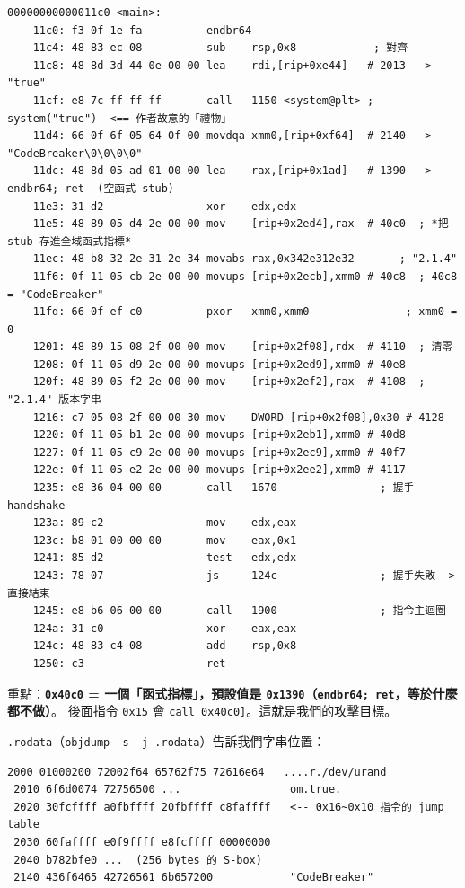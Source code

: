 \documentclass[10pt,a4paper]{article}
\begin{document}
\begin{Verbatim}[breaklines=true,breakanywhere=true,breakautoindent=false,fontsize=\fontsize{7.0}{9.5}\selectfont]
00000000000011c0 <main>:
    11c0: f3 0f 1e fa          endbr64
    11c4: 48 83 ec 08          sub    rsp,0x8            ; 對齊
    11c8: 48 8d 3d 44 0e 00 00 lea    rdi,[rip+0xe44]   # 2013  -> "true"
    11cf: e8 7c ff ff ff       call   1150 <system@plt> ; system("true")  <== 作者故意的「禮物」
    11d4: 66 0f 6f 05 64 0f 00 movdqa xmm0,[rip+0xf64]  # 2140  -> "CodeBreaker\0\0\0\0"
    11dc: 48 8d 05 ad 01 00 00 lea    rax,[rip+0x1ad]   # 1390  -> endbr64; ret  (空函式 stub)
    11e3: 31 d2                xor    edx,edx
    11e5: 48 89 05 d4 2e 00 00 mov    [rip+0x2ed4],rax  # 40c0  ; *把 stub 存進全域函式指標*
    11ec: 48 b8 32 2e 31 2e 34 movabs rax,0x342e312e32       ; "2.1.4"
    11f6: 0f 11 05 cb 2e 00 00 movups [rip+0x2ecb],xmm0 # 40c8  ; 40c8 = "CodeBreaker"
    11fd: 66 0f ef c0          pxor   xmm0,xmm0               ; xmm0 = 0
    1201: 48 89 15 08 2f 00 00 mov    [rip+0x2f08],rdx  # 4110  ; 清零
    1208: 0f 11 05 d9 2e 00 00 movups [rip+0x2ed9],xmm0 # 40e8
    120f: 48 89 05 f2 2e 00 00 mov    [rip+0x2ef2],rax  # 4108  ; "2.1.4" 版本字串
    1216: c7 05 08 2f 00 00 30 mov    DWORD [rip+0x2f08],0x30 # 4128
    1220: 0f 11 05 b1 2e 00 00 movups [rip+0x2eb1],xmm0 # 40d8
    1227: 0f 11 05 c9 2e 00 00 movups [rip+0x2ec9],xmm0 # 40f7
    122e: 0f 11 05 e2 2e 00 00 movups [rip+0x2ee2],xmm0 # 4117
    1235: e8 36 04 00 00       call   1670                ; 握手 handshake
    123a: 89 c2                mov    edx,eax
    123c: b8 01 00 00 00       mov    eax,0x1
    1241: 85 d2                test   edx,edx
    1243: 78 07                js     124c                ; 握手失敗 -> 直接結束
    1245: e8 b6 06 00 00       call   1900                ; 指令主迴圈
    124a: 31 c0                xor    eax,eax
    124c: 48 83 c4 08          add    rsp,0x8
    1250: c3                   ret
\end{Verbatim}

重點：\textbf{\texttt{0x40c0} = 一個「函式指標」，預設值是
\texttt{0x1390}（\texttt{endbr64;\ \allowbreak{}ret}，等於什麼都不做）}。 後面指令
\texttt{0x15} 會 \texttt{call\ \allowbreak{}{[}0x40c0{]}}。這就是我們的攻擊目標。

\texttt{.\allowbreak{}rodata}（\texttt{objdump\ \allowbreak{}-\allowbreak{}s\ \allowbreak{}-\allowbreak{}j\ \allowbreak{}.\allowbreak{}rodata}）告訴我們字串位置：

\begin{Verbatim}[breaklines=true,breakanywhere=true,breakautoindent=false,fontsize=\fontsize{7.0}{9.5}\selectfont]
 2000 01000200 72002f64 65762f75 72616e64   ....r./dev/urand
 2010 6f6d0074 72756500 ...                 om.true.
 2020 30fcffff a0fbffff 20fbffff c8faffff   <-- 0x16~0x10 指令的 jump table
 2030 60faffff e0f9ffff e8fcffff 00000000
 2040 b782bfe0 ...  (256 bytes 的 S-box)
 2140 436f6465 42726561 6b657200            "CodeBreaker"
\end{Verbatim}
\end{document}
